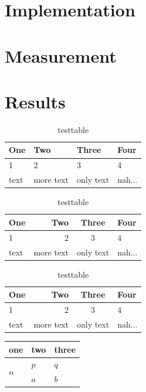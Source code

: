 \documentclass[a4paper]{article}
\begin{document}
  \section{Implementation}
  \section{Measurement}
  \section{Results}

    \begin{table}[H]
      \center
      \caption{testtable}
      \begin{tabular}{llll}
        \hline
        One & Two & Three & Four \\
        \hline
        \hline
        1 & 2 & 3 & 4 \\
        text & more text & only text & nah... \\
        \hline
      \end{tabular}
    \end{table}

    \begin{table}[H]
      \center
      \caption{testtable}
      \begin{tabular}{lrcl}
        \hline
        One & Two & Three & Four \\
        \hline
        \hline
        1 & 2 & 3 & 4 \\
        text & more text & only text & nah... \\
        \hline
      \end{tabular}
    \end{table}

    \begin{table}[H]
      \center
      \caption{testtable}
      \begin{tabular}{|l|r|cl|}
        \hline
        One & Two & Three & Four \\
        \hline
        \hline
        1 & 2 & 3 & 4 \\
        text & more text & only text & nah... \\
        \hline
      \end{tabular}
    \end{table}

    \begin{table}[H]
      \center
      \begin{tabular}{lll}
        \hline
        one & two & three \\
        \hline
        \hline
        \multirow{2}{*}{$n$} & $p$ & $q$ \\
          & $a$ & $b$ \\
        \hline
      \end{tabular}
    \end{table}
\end{document}
